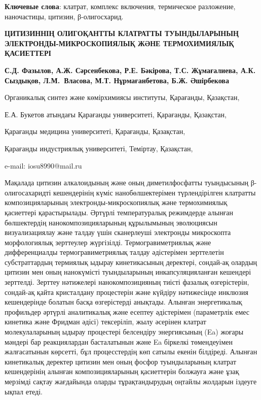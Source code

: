 {\bfseries Ключевые слова}: клатрат, комплекс включения, термическое
разложение, наночастицы, цитизин, β-олигосхарид.

\begin{header}
{\bfseries ЦИТИЗИННІҢ ОЛИГОҚАНТТЫ КЛАТРАТТЫ ТУЫНДЫЛАРЫНЫҢ
ЭЛЕКТРОНДЫ-МИКРОСКОПИЯЛЫҚ ЖӘНЕ ТЕРМОХИМИЯЛЫҚ ҚАСИЕТТЕРІ}

{\bfseries
{}С.Д. Фазылов\envelope,
А.Ж. Сәрсенбекова,
Р.Е. Бәкірова,
Т.С. Жұмағалиева,
А.К. Сыздықов,
Л.М.~Власова,
М.Т. Нұрмағанбетова,
Б.Ж. Әшірбекова
}
\end{header}

\begin{affil}
Органикалық синтез және көмірхимиясы институты, Қарағанды, Қазақстан,

Е.А. Букетов атындағы Қарағанды университеті, Қарағанды, Қазақстан,

Қарағанды медицина университеті, Қарағанды, Қазақстан,

Қарағанды индустриялық университеті, Теміртау, Қазақстан,

e-mail: iosu8990@mail.ru
\end{affil}

Мақалада цитизин алкалоидының және оның диметилфосфатты туындысының
β-олигосахаридті кешендерінің күміс нанобөлшектерімен түрлендірілген
клатратты композицияларының электрон\-ды-микроскопиялық және термохимиялық
қасиеттері қарастырылады. Әртүрлі температуралық режимдерде алынған
бөлшектердің нанокомпозицияларының құрылымының эволюциясын
визуализациялау және талдау үшін сканерлеуші электронды микроскопта
морфологиялық зерттеулер жүргізілді. Термогравиметриялық және
дифференциалды термогравиметриялық талдау әдістерімен зерттелетін
субстраттардың термиялық ыдырау кинетикасының деректері, сондай-ақ
олардың цитизин мен оның нанокүмісті туындыларының инкапсуляцияланған
кешендері зерттелді. Зерттеу нәтижелері нанокомпозицияның тиісті фазалық
өзгерістерін, сондай-ақ қайта кристалдану процестерін және күйдіру
нәтижесінде инклюзия кешендерінде болатын басқа өзгерістерді анықтады.
Алынған энергетикалық профильдер әртүрлі аналитикалық және есептеу
әдістерімен (параметрлік емес кинетика және Фридман әдісі) тексеріліп,
жылу әсерінен клатрат молекулаларының ыдырау процестері белсендіру
энергиясының (Ea) жоғары мәндері бар реакциялардан басталатынын және Ea
біркелкі төмендеуімен жалғасатынын көрсетті, бұл процесстердің көп
сатылы екенін білдіреді. Алынған кинетикалық деректер цитизин мен оның
фосфор туындыларының клатрат кешендерінің алынған композицияларының
қасиеттерін болжауға және ұзақ мерзімді сақтау жағдайында оларды
тұрақтандырудың оңтайлы жолдарын іздеуге ықпал етеді.


